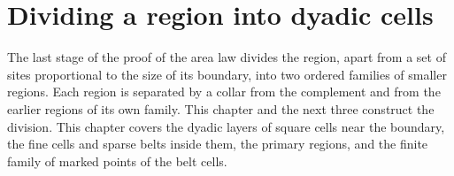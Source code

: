 \chapter{Dividing a region into dyadic cells}%
\label{ch:peps_area_law_geometry}

The last stage of the proof of the area law \cite[Section~11]{OpenAI2026AreaLaw}
divides the region, apart from a set of sites proportional to the size of its
boundary, into two ordered families of smaller regions. Each region is
separated by a collar from the complement and from the earlier regions of its
own family. This chapter and the next three construct the division. This
chapter covers the dyadic layers of square cells near the boundary, the fine
cells and sparse belts inside them, the primary regions, and the finite family
of marked points of the belt cells.



















